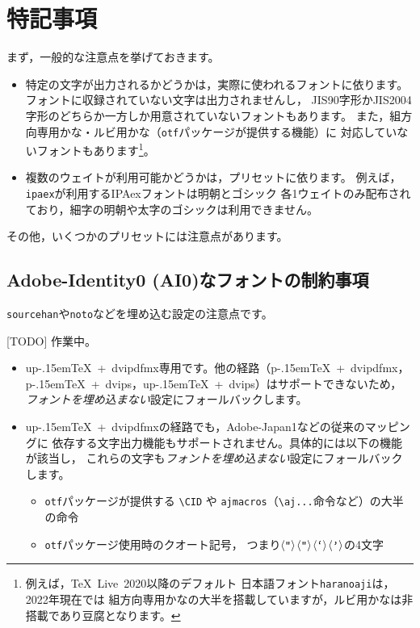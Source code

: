 \documentclass{jlreq}
\def\file#1{\texttt{#1}}
\def\command#1{\texttt{#1}}
\def\codechar#1{\ensuremath{\langle\mbox{\texttt{#1}}\rangle}}
\def\TL{\TeX~Live}
\def\pTeX{p\kern-.15em\TeX}
\def\upTeX{u\pTeX}
\begin{document}
\clearpage


\section{特記事項}

まず，一般的な注意点を挙げておきます。
\begin{itemize}
  \item 特定の文字が出力されるかどうかは，実際に使われるフォントに依ります。
        フォントに収録されていない文字は出力されませんし，
        JIS90字形かJIS2004字形のどちらか一方しか用意されていないフォントもあります。
        また，組方向専用かな・ルビ用かな（\file{otf}パッケージが提供する機能）に
        対応していないフォントもあります\footnote{例えば，\TL~2020以降のデフォルト
        日本語フォント\command{haranoaji}は，2022年現在では
        組方向専用かなの大半を搭載していますが，ルビ用かなは非搭載であり豆腐となります。}。
  \item 複数のウェイトが利用可能かどうかは，プリセットに依ります。
        例えば，\command{ipaex}が利用するIPAexフォントは明朝とゴシック
        各1ウェイトのみ配布されており，細字の明朝や太字のゴシックは利用できません。
\end{itemize}

その他，いくつかのプリセットには注意点があります。

\subsection{Adobe-Identity0 (AI0)なフォントの制約事項}\label{ai0}

\command{sourcehan}や\command{noto}などを埋め込む設定の注意点です。

[TODO] 作業中。

\begin{itemize}
  \item \upTeX~+~dvipdfmx専用です。他の経路（\pTeX~+~dvipdfmx，
        \pTeX~+~dvips，\upTeX~+~dvips）はサポートできないため，
        \emph{フォントを埋め込まない}設定にフォールバックします。
  \item \upTeX~+~dvipdfmxの経路でも，Adobe-Japan1などの従来のマッピングに
        依存する文字出力機能もサポートされません。具体的には以下の機能が該当し，
        これらの文字も\emph{フォントを埋め込まない}設定にフォールバックします。
    \begin{itemize}
      \item \file{otf}パッケージが提供する \verb+\CID+ や
            \file{ajmacros}（\verb+\aj...+命令など）の大半の命令
      \item \file{otf}パッケージ使用時のクオート記号，
            つまり\codechar{“}\codechar{”}\codechar{‘}\codechar{’}の4文字
    \end{itemize}
\end{itemize}
\end{document}
